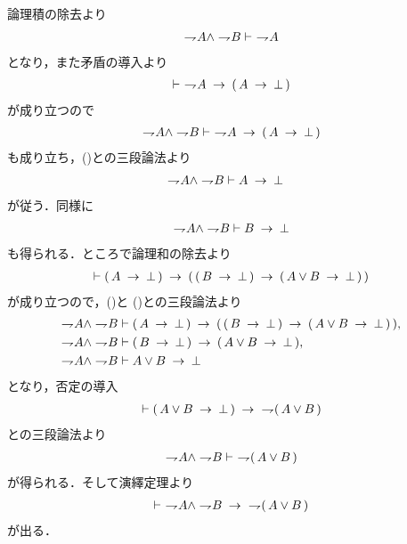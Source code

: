 	\begin{prf}
		論理積の除去より
		\begin{align}
			\negation A \wedge \negation B \vdash\ \negation A
			\label{fom:weak_De_Morgan_law_1_1}
		\end{align}
		となり，また矛盾の導入より
		\begin{align}
			\vdash\ \negation A \rarrow (\, A \rarrow \bot\, )
		\end{align}
		が成り立つので
		\begin{align}
			\negation A \wedge \negation B 
			\vdash\ \negation A \rarrow (\, A \rarrow \bot\, )
		\end{align}
		も成り立ち，()との三段論法より
		\begin{align}
			\negation A \wedge \negation B &\vdash A \rarrow \bot
			\label{fom:weak_De_Morgan_law_1_2}
		\end{align}
		が従う．同様に
		\begin{align}
			\negation A \wedge \negation B \vdash B \rarrow \bot
			\label{fom:weak_De_Morgan_law_1_3}
		\end{align}
		も得られる．ところで論理和の除去より
		\begin{align}
			\vdash (\, A \rarrow \bot\, ) \rarrow (\, (\, B \rarrow \bot\, )
			\rarrow (\, A \vee B \rarrow \bot\, )\, )
		\end{align}
		が成り立つので，()と
		()との三段論法より
		\begin{align}
			\negation A \wedge \negation B &\vdash (\, A \rarrow \bot\, ) 
			\rarrow (\, (\, B \rarrow \bot\, ) 
			\rarrow (\, A \vee B \rarrow \bot\, )\, ), \\
			\negation A \wedge \negation B &\vdash (\, B \rarrow \bot\, ) 
			\rarrow (\, A \vee B \rarrow \bot\, ), \\
			\negation A \wedge \negation B &\vdash A \vee B \rarrow \bot
		\end{align}
		となり，否定の導入
		\begin{align}
			\vdash (\, A \vee B \rarrow \bot\, ) \rarrow\ \negation (\, A \vee B\, )
		\end{align}
		との三段論法より
		\begin{align}
			\negation A \wedge \negation B \vdash\ \negation (\, A \vee B\, ) 
		\end{align}
		が得られる．そして演繹定理より
		\begin{align}
			\vdash\ \negation A \wedge \negation B
				\rarrow\ \negation (\, A \vee B\, )
		\end{align}
		が出る．
		\QED
	\end{prf}
	
